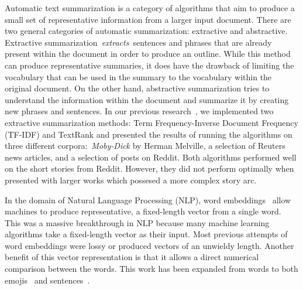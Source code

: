 \documentclass{article}[10]
\begin{document}
Automatic text summarization is a category of algorithms that aim to produce a small set of representative information from a larger input document. There are two general categories of automatic summarization: extractive and abstractive. Extractive summarization~\emph{extracts~}sentences and phrases that are already present within the document in order to produce an outline. While this method can produce representative summaries, it does have the drawback of limiting the vocabulary that can be used in the summary to the vocabulary within the original document. On the other hand, abstractive summarization tries to understand the information within the document and summarize it by creating new phrases and sentences. In our previous research~\cite{day_extractive}, we implemented two extractive summarization methods: Term Frequency-Inverse Document Frequency (TF-IDF) and TextRank and presented the results of running the algorithms on three different corpora:~\emph{Moby-Dick} by Herman Melville, a selection of Reuters news articles, and a selection of posts on Reddit. Both algorithms performed well on the short stories from Reddit. However, they did not perform optimally when presented with larger works which possesed a more complex story arc.

In the domain of Natural Language Processing (NLP), word embeddings~\cite{mikolov2013efficient} allow machines to produce representative, a fixed-length vector from a single word. This was a massive breakthrough in NLP because many machine learning algorithms take a fixed-length vector as their input. Most previous attempts of word embeddings were lossy or produced vectors of an unwieldy length. Another benefit of this vector representation is that it allows a direct numerical comparison between the words. This work has been expanded from words to both emojis~\cite{Eisner_2016} and sentences~\cite{pg2017unsu}.
\end{document}
